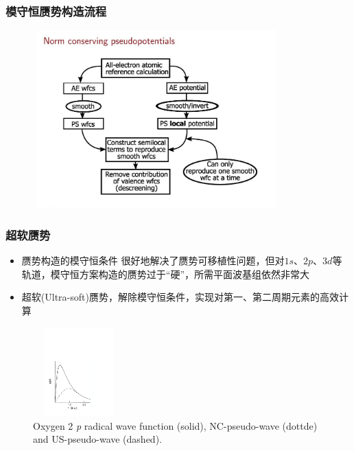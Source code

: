 \documentclass[cjk,slidestop,compress,mathserif,blue]{beamer}
\begin{document}
\frame
{
	\frametitle{模守恒赝势构造流程}
\begin{figure}[h!]
\centering
\includegraphics[height=2.70in,width=3.77in,viewport=70 40 900 610,clip]{Figures/Pseudo-NC.jpg}
\label{Pseudo-NC}
\end{figure}
}

\frame
{
\frametitle{超软赝势}
\begin{itemize}
\setlength{\itemsep}{5pt}
	\item 赝势构造的模守恒条件
	很好地解决了赝势可移植性问题，但对$1s$、$2p$、$3d$等轨道，模守恒方案构造的赝势过于“硬”，所需平面波基组依然非常大
	\item 超软\textrm{(Ultra-soft)}赝势，解除模守恒条件，实现对第一、第二周期元素的高效计算
\end{itemize}
\begin{figure}[h!]
\vspace*{-0.10in}
\centering
\includegraphics[height=1.35in,width=1.40in,viewport=30 55 415 500,clip]{Figures/Norm-US-wave.pdf}
\caption{\tiny \textrm{Oxygen 2} \textit{p} \textrm{radical wave function (solid), NC-pseudo-wave (dottde) and US-pseudo-wave (dashed).}}%
\label{Norm-US-wave}
\end{figure}
}
\end{document}
